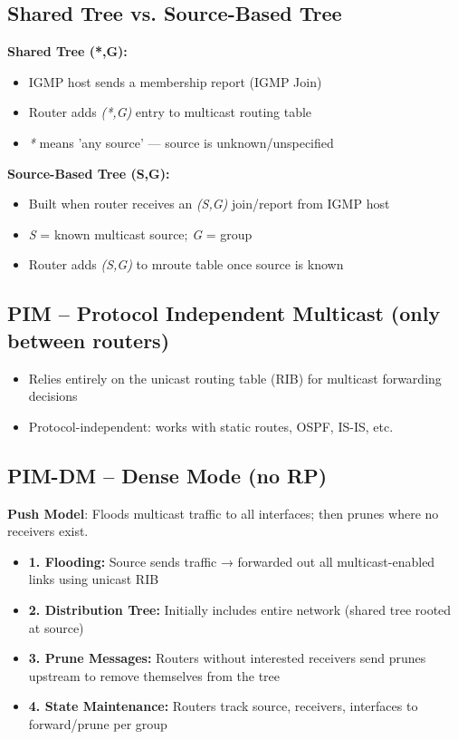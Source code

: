 \begin{multicols*}{5}
		\subsection{Shared Tree vs. Source-Based Tree}
		\textbf{Shared Tree (*,G):}
		\begin{itemize}
			\item IGMP host sends a membership report (IGMP Join)
			\item Router adds \textit{(*,G)} entry to multicast routing table
			\item \textit{*} means 'any source' — source is unknown/unspecified
		\end{itemize}
		
		\textbf{Source-Based Tree (S,G):}
		\begin{itemize}
			\item Built when router receives an \textit{(S,G)} join/report from IGMP host
			\item \textit{S} = known multicast source; \textit{G} = group
			\item Router adds \textit{(S,G)} to mroute table once source is known
		\end{itemize}
		
		\subsection{PIM – Protocol Independent Multicast (only between routers)}
		\begin{itemize}
			\item Relies entirely on the unicast routing table (RIB) for multicast forwarding decisions
			\item Protocol-independent: works with static routes, OSPF, IS-IS, etc.
		\end{itemize}
		
		\subsection{PIM-DM – Dense Mode (no RP)}
		\textbf{Push Model}: Floods multicast traffic to all interfaces; then prunes where no receivers exist.
		
		\begin{itemize}
			\item \textbf{1. Flooding:} Source sends traffic → forwarded out all multicast-enabled links using unicast RIB
			\item \textbf{2. Distribution Tree:} Initially includes entire network (shared tree rooted at source)
			\item \textbf{3. Prune Messages:} Routers without interested receivers send prunes upstream to remove themselves from the tree
			\item \textbf{4. State Maintenance:} Routers track source, receivers, interfaces to forward/prune per group
		\end{itemize}
		

\end{multicols*}
